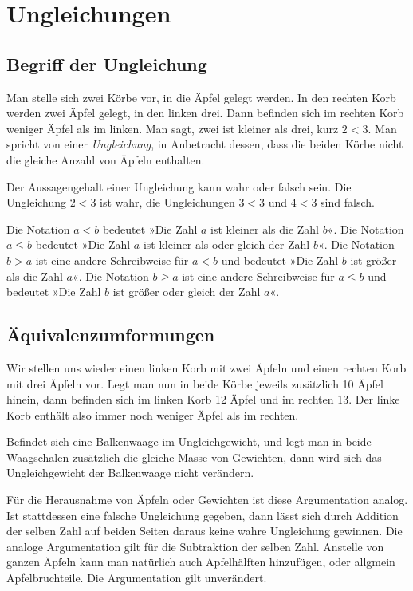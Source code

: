 \newpage
\section{Ungleichungen}

\subsection{Begriff der Ungleichung}

Man stelle sich zwei Körbe vor, in die Äpfel gelegt werden.
In den rechten Korb werden zwei Äpfel gelegt, in den linken drei.
Dann befinden sich im rechten Korb weniger Äpfel als im linken.
Man sagt, zwei ist kleiner als drei, kurz $2<3$. Man spricht von
einer \emph{Ungleichung}, in Anbetracht dessen, dass die beiden
Körbe nicht die gleiche Anzahl von Äpfeln enthalten.

Der Aussagengehalt einer Ungleichung kann wahr oder falsch sein.
Die Ungleichung $2<3$ ist wahr, die Ungleichungen $3<3$ und
$4<3$ sind falsch.

\begin{Definition}[Ungleichungsrelation]
Die Notation $a<b$ bedeutet »Die Zahl $a$ ist kleiner als
die Zahl $b$«. Die Notation $a\le b$ bedeutet »Die Zahl $a$
ist kleiner als oder gleich der Zahl $b$«. Die Notation
$b>a$ ist eine andere Schreibweise für $a<b$ und bedeutet
»Die Zahl $b$ ist größer als die Zahl $a$«. Die Notation
$b\ge a$ ist eine andere Schreibweise für $a\le b$ und
bedeutet »Die Zahl $b$ ist größer oder gleich der Zahl $a$«.
\end{Definition}

\subsection{Äquivalenzumformungen}

Wir stellen uns wieder einen linken Korb mit zwei Äpfeln und
einen rechten Korb mit drei Äpfeln vor. Legt man nun in beide
Körbe jeweils zusätzlich 10 Äpfel hinein, dann befinden sich
im linken Korb 12 Äpfel und im rechten 13. Der linke Korb
enthält also immer noch weniger Äpfel als im rechten.

Befindet sich eine Balkenwaage im Ungleichgewicht, und legt man
in beide Waagschalen zusätzlich die gleiche Masse von Gewichten,
dann wird sich das Ungleichgewicht der Balkenwaage nicht verändern.

Für die Herausnahme von Äpfeln oder Gewichten ist diese Argumentation
analog. Ist stattdessen eine falsche Ungleichung gegeben,
dann lässt sich durch Addition der selben Zahl auf beiden Seiten
daraus keine wahre Ungleichung gewinnen. Die analoge Argumentation
gilt für die Subtraktion der selben Zahl. Anstelle von ganzen
Äpfeln kann man natürlich auch Apfelhälften hinzufügen, oder
allgmein Apfelbruchteile. Die Argumentation gilt unverändert.

